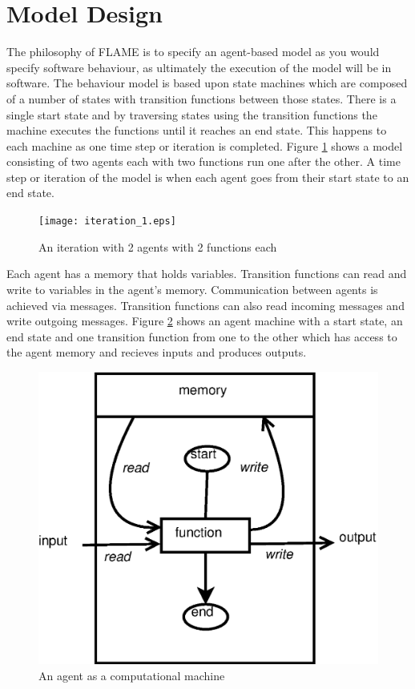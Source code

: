 \section{Model Design}
\label{sec:model_design}

The philosophy of FLAME is to specify an agent-based model as you would specify
software behaviour, as ultimately the execution of the model will be in software.
The behaviour model is based upon state machines which are composed of a number
of states with transition functions between those states. There is a single
start state and by traversing states using the transition functions the machine
executes the functions until it reaches an end state. This happens to each
machine as one time step or iteration is completed. Figure
\ref{fig:iteration_1} shows a model consisting of two agents each with two
functions run one after the other. A time step or iteration of the model is when
each agent goes from their start state to an end state.

\begin{figure}[ht]
\begin{center}
\texttt{[image: iteration\_1.eps]}
\caption{An iteration with 2 agents with 2 functions each}
\label{fig:iteration_1}
\end{center}
\end{figure}

Each agent has a memory that holds variables. Transition functions can read and
write to variables in the agent's memory. Communication between agents is
achieved via messages. Transition functions can also read incoming messages and write
outgoing messages. Figure \ref{fig:xmachine} shows an agent machine with a start state, 
an end state and one transition function from one to the other which has access to the 
agent memory and recieves inputs
and produces outputs.

\begin{figure}[ht]
\begin{center}
\includegraphics*[scale=0.5]{xmachine.eps}
\caption{An agent as a computational machine}
\label{fig:xmachine}
\end{center}
\end{figure}

